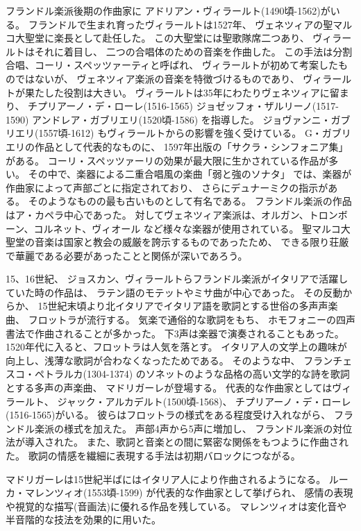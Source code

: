 \documentclass[a4j]{jarticle}
\begin{document}
フランドル楽派後期の作曲家に
アドリアン・ヴィラールト(1490頃-1562)がいる。
フランドルで生まれ育ったヴィラールトは1527年、
ヴェネツィアの聖マルコ大聖堂に楽長として赴任した。
この大聖堂には聖歌隊席二つあり、
ヴィラールトはそれに着目し、
二つの合唱体のための音楽を作曲した。
この手法は分割合唱、コーリ・スペッツァーティと呼ばれ、
ヴィラールトが初めて考案したものではないが、
ヴェネツィア楽派の音楽を特徴づけるものであり、
ヴィラールトが果たした役割は大きい。
ヴィラールトは35年にわたりヴェネツィアに留まり、
チプリアーノ・デ・ローレ(1516-1565)
ジョゼッフォ・ザルリーノ(1517-1590)
アンドレア・ガブリエリ(1520頃-1586)
を指導した。
ジョヴァンニ・ガブリエリ(1557頃-1612)
もヴィラールトからの影響を強く受けている。
G・ガブリエリの作品として代表的なものに、
1597年出版の「サクラ・シンフォニア集」がある。
コーリ・スペッツァーリの効果が最大限に生かされている作品が多い。
その中で、楽器による二重合唱風の楽曲「弱と強のソナタ」
では、楽器が作曲家によって声部ごとに指定されており、
さらにデュナーミクの指示がある。
そのようなものの最も古いものとして有名である。
フランドル楽派の作品はア・カペラ中心であった。
対してヴェネツィア楽派は、オルガン、トロンボーン、コルネット、ヴィオール
など様々な楽器が使用されている。
聖マルコ大聖堂の音楽は国家と教会の威厳を誇示するものであったため、
できる限り荘厳で華麗である必要があったことと関係が深いであろう。

15、16世紀、
ジョスカン、ヴィラールトらフランドル楽派がイタリアで活躍していた時の作品は、
ラテン語のモテットやミサ曲が中心であった。
その反動からか、
15世紀末頃より北イタリアでイタリア語を歌詞とする世俗の多声声楽曲、
フロットラが流行する。
気楽で通俗的な歌詞をもち、
ホモフォニーの四声書法で作曲されることが多かった。
下3声は楽器で演奏されることもあった。
1520年代に入ると、フロットラは人気を落とす。
イタリア人の文学上の趣味が向上し、浅薄な歌詞が合わなくなったためである。
そのような中、
フランチェスコ・ペトラルカ(1304-1374)
のソネットのような品格の高い文学的な詩を歌詞とする多声の声楽曲、
マドリガーレが登場する。
代表的な作曲家としてはヴィラールト、
ジャック・アルカデルト(1500頃-1568)、
チプリアーノ・デ・ローレ(1516-1565)がいる。
彼らはフロットラの様式をある程度受け入れながら、
フランドル楽派の様式を加えた。
声部4声から5声に増加し、
フランドル楽派の対位法が導入された。
また、歌詞と音楽との間に緊密な関係をもつように作曲された。
歌詞の情感を繊細に表現する手法は初期バロックにつながる。

マドリガーレは15世紀半ばにはイタリア人により作曲されるようになる。
ルーカ・マレンツィオ(1553頃-1599)
が代表的な作曲家として挙げられ、
感情の表現や視覚的な描写(音画法)に優れる作品を残している。
マレンツィオは変化音や半音階的な技法を効果的に用いた。
\end{document}
